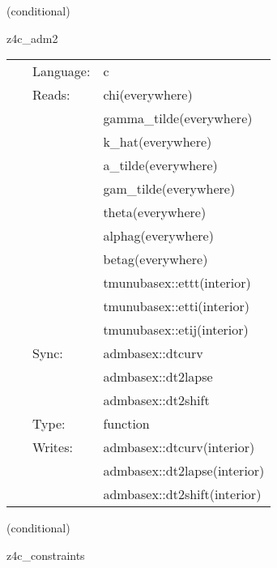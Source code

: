 \vspace{5mm}

   (conditional) 

\hspace{5mm} z4c\_adm2 

\hspace{5mm}{\it calculate second time derivatives of adm variables } 


\hspace{5mm}

 \begin{tabular*}{160mm}{cll} 
~ & Language:  & c \\ 
~ & Reads:  & chi(everywhere) \\ 
~& ~ &gamma\_tilde(everywhere)\\ 
~& ~ &k\_hat(everywhere)\\ 
~& ~ &a\_tilde(everywhere)\\ 
~& ~ &gam\_tilde(everywhere)\\ 
~& ~ &theta(everywhere)\\ 
~& ~ &alphag(everywhere)\\ 
~& ~ &betag(everywhere)\\ 
~& ~ &tmunubasex::ettt(interior)\\ 
~& ~ &tmunubasex::etti(interior)\\ 
~& ~ &tmunubasex::etij(interior)\\ 
~ & Sync:  & admbasex::dtcurv \\ 
~& ~ &admbasex::dt2lapse\\ 
~& ~ &admbasex::dt2shift\\ 
~ & Type:  & function \\ 
~ & Writes:  & admbasex::dtcurv(interior) \\ 
~& ~ &admbasex::dt2lapse(interior)\\ 
~& ~ &admbasex::dt2shift(interior)\\ 
\end{tabular*} 


\vspace{5mm}

   (conditional) 

\hspace{5mm} z4c\_constraints 

\hspace{5mm}{\it calculate z4c constraints } 


\hspace{5mm}

